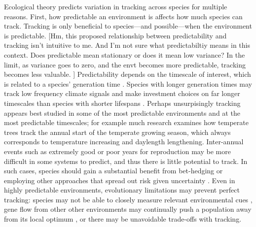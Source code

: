 \documentclass[11pt,letterpaper]{article}
\begin{document}
Ecological theory predicts variation in tracking across species for multiple reasons. First, how predictable an environment is affects how much species can track.  Tracking is only beneficial to species---and possible---when the environment is predictable. [Hm, this proposed relationship between predictability and tracking isn't intuitive to me. And I'm not sure what predictabiltiy means in this context.  Does predictable mean stationary or does it mean low variance?  In the limit, as variance goes to zero, and the envt becomes more predictable, tracking becomes less valuable. ] Predictability depends on the timescale of interest, which is related to a species' generation time \citep[which itself should be shaped by an environment and its predictability,][]{Davison2010,morris2008}. Species with longer generation times may track low frequency climate signals and make investment choices on far longer timescales than species with shorter lifespans \citep{morris2008}. Perhaps unsurpisingly tracking appears best studied in some of the most predictable environments and at the most predictable timescales; for example much research examines how temperate trees track the annual start of the temperate growing season, which always corresponds to temperature increasing and daylength lengthening. Inter-annual events such as extremely good or poor years for reproduction may be more difficult in some systems to predict, and thus there is little potential to track. In such cases, species should gain a substantial benefit from bet-hedging or employing other approaches that spread out risk given uncertainty \citep{Venable:2007os,donald2013}. Even in highly predictable environments, evolutionary limitations may prevent perfect tracking: species may not be able to closely measure relevant environmental cues \citep{arnold1992,Singer:2010eb}, gene flow from other other environments may continually push a population away from its local optimum \citep{lenormand2002}, or there may be unavoidable trade-offs \citep{levins1968} with tracking. 
\end{document}
